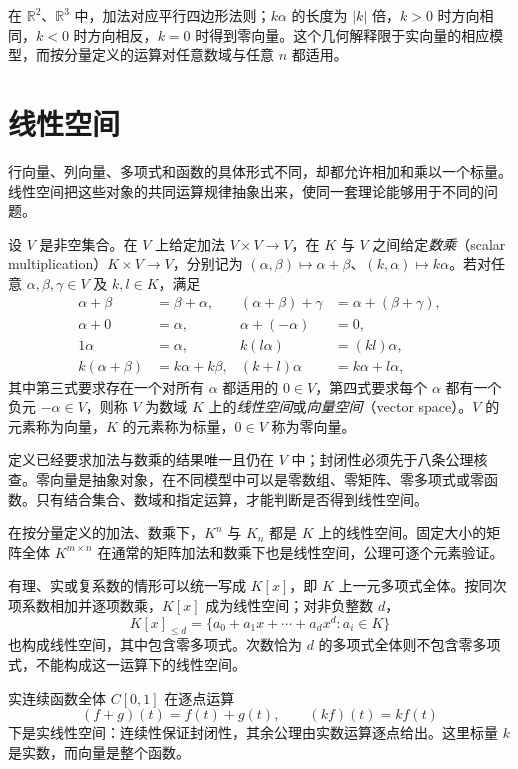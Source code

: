 在 $\mathbb R^2$、$\mathbb R^3$ 中，加法对应平行四边形法则；$k\alpha$ 的长度为 $|k|$ 倍，$k>0$ 时方向相同，$k<0$ 时方向相反，$k=0$ 时得到零向量。这个几何解释限于实向量的相应模型，而按分量定义的运算对任意数域与任意 $n$ 都适用。

\section{线性空间}
\label{sec:vector-space-axioms}

行向量、列向量、多项式和函数的具体形式不同，却都允许相加和乘以一个标量。线性空间把这些对象的共同运算规律抽象出来，使同一套理论能够用于不同的问题。

\begin{definition}
\label{def:vector-space}
设 $V$ 是非空集合。在 $V$ 上给定加法 $V\times V\to V$，在 $K$ 与 $V$ 之间给定\emph{数乘}（scalar multiplication）$K\times V\to V$，分别记为 $(\alpha,\beta)\mapsto\alpha+\beta$、$(k,\alpha)\mapsto k\alpha$。若对任意 $\alpha,\beta,\gamma\in V$ 及 $k,l\in K$，满足
\begin{align*}
    \alpha+\beta&=\beta+\alpha,&
    (\alpha+\beta)+\gamma&=\alpha+(\beta+\gamma),\\
    \alpha+0&=\alpha,&
    \alpha+(-\alpha)&=0,\\
    1\alpha&=\alpha,&
    k(l\alpha)&=(kl)\alpha,\\
    k(\alpha+\beta)&=k\alpha+k\beta,&
    (k+l)\alpha&=k\alpha+l\alpha,
\end{align*}
其中第三式要求存在一个对所有 $\alpha$ 都适用的 $0\in V$，第四式要求每个 $\alpha$ 都有一个负元 $-\alpha\in V$，则称 $V$ 为数域 $K$ 上的\emph{线性空间}或\emph{向量空间}（vector space）。$V$ 的元素称为向量，$K$ 的元素称为标量，$0\in V$ 称为零向量。
\end{definition}

定义已经要求加法与数乘的结果唯一且仍在 $V$ 中；封闭性必须先于八条公理核查。零向量是抽象对象，在不同模型中可以是零数组、零矩阵、零多项式或零函数。只有结合集合、数域和指定运算，才能判断是否得到线性空间。

\begin{example}
\label{ex:basic-vector-spaces}
在按分量定义的加法、数乘下，$K^n$ 与 $K_n$ 都是 $K$ 上的线性空间。固定大小的矩阵全体 $K^{m\times n}$ 在通常的矩阵加法和数乘下也是线性空间，公理可逐个元素验证。

有理、实或复系数的情形可以统一写成 $K[x]$，即 $K$ 上一元多项式全体。按同次项系数相加并逐项数乘，$K[x]$ 成为线性空间；对非负整数 $d$，
\[
    K[x]_{\leq d}=\{a_0+a_1x+\cdots+a_dx^d:a_i\in K\}
\]
也构成线性空间，其中包含零多项式。次数恰为 $d$ 的多项式全体则不包含零多项式，不能构成这一运算下的线性空间。

实连续函数全体 $C[0,1]$ 在逐点运算
\[
    (f+g)(t)=f(t)+g(t),\qquad (kf)(t)=k f(t)
\]
下是实线性空间：连续性保证封闭性，其余公理由实数运算逐点给出。这里标量 $k$ 是实数，而向量是整个函数。
\end{example}

